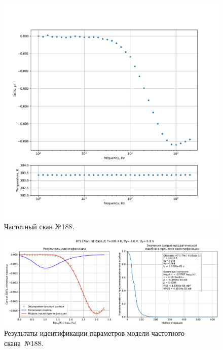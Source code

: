 \begin{figure}[!ht]
    \centering
    \includegraphics[width=1\textwidth]{../plots/КТ117№1_п1(база 2)_2500Гц-1Гц_1пФ_+30С_-3В-5В_100мВ_20мкс_шаг_0,1.pdf}
    \caption{Частотный скан №188.}
    \label{pic:frequency_scan_188}
\end{figure}

\begin{figure}[!ht]
    \centering
    \includegraphics[width=1\textwidth]{../plots/КТ117№1_п1(база 2)_2500Гц-1Гц_1пФ_+30С_-3В-5В_100мВ_20мкс_шаг_0,1_model.pdf}
    \caption{Результаты идентификации параметров модели частотного скана~№188.}
    \label{pic:frequency_scan_model188}
\end{figure}

\pagebreak


